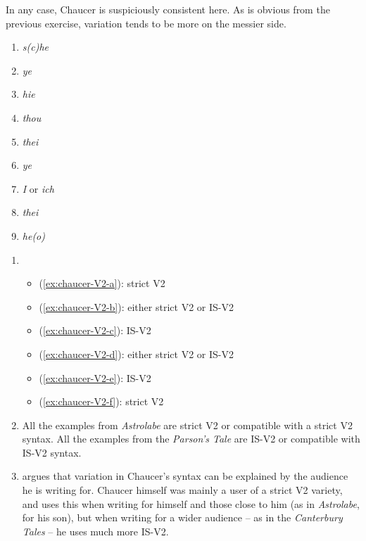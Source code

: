 \noindent In any case, Chaucer is suspiciously consistent here. As is obvious from the previous exercise, variation tends to be more on the messier side.\\


\noindent\textbf{}
\begin{multicols}{2}
\begin{enumerate}
    \item \emph{s(c)he}
    \item \emph{ye}
    \item \emph{hie}
    \item \emph{thou}
    \item \emph{thei}
    \item \emph{ye}
    \item \emph{I} or \emph{ich}
    \item \emph{thei}
    \item \emph{he(o)}
\end{enumerate}
\end{multicols}


\noindent\textbf{}
\begin{enumerate}
    \item \begin{itemize}
        \item (\ref{ex:chaucer-V2-a}): strict V2
        \item (\ref{ex:chaucer-V2-b}): either strict V2 or IS-V2
        \item (\ref{ex:chaucer-V2-c}): IS-V2
        \item (\ref{ex:chaucer-V2-d}): either strict V2 or IS-V2
        \item (\ref{ex:chaucer-V2-e}): IS-V2
        \item (\ref{ex:chaucer-V2-f}): strict V2
    \end{itemize}
    \item All the examples from \emph{Astrolabe} are strict V2 or compatible with a strict V2 syntax. All the examples from the \emph{Parson's Tale} are IS-V2 or compatible with IS-V2 syntax.
    \item \citet{Eitler2006} argues that variation in Chaucer's syntax can be explained by the audience he is writing for. Chaucer himself was mainly a user of a strict V2 variety, and uses this when writing for himself and those close to him (as in \emph{Astrolabe}, for his son), but when writing for a wider audience -- as in the \emph{Canterbury Tales} -- he uses much more IS-V2.
\end{enumerate}

